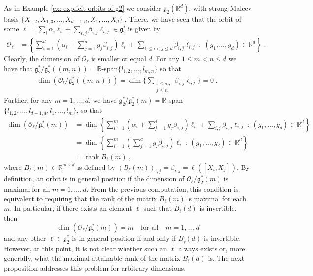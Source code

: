 \documentclass[10pt,a4paper]{amsart}
\newcommand{\R}{\mathbb{R}}
\newcommand{\fancyg}{\mathfrak{g}}
\begin{document}
	\begin{example}\label{ex: general orbits of g2 pt1}
		As in Example \ref{ex: explicit orbits of g2} we consider $\fancyg_2(\R^d)$, with strong Malcev basis $\{X_{1,2}, X_{1,3}, \ldots, X_{d-1,d},X_1, \ldots, X_d\}$ . There, we have seen that the orbit of some $\ell = \sum_i \alpha_i \ell_i + \sum_{i,j} \beta_{i,j} \ell_{i,j} \in \fancyg_2^*$ is given by
		\begin{align*}
			\mathcal{O}_\ell &= \left\{\sum_{i=1}^d(\alpha_i+\sum_{j=1}^dg_{j}\beta_{i,j})\ell_i+\sum_{1\leq i<j\leq d}\beta_{i,j}\ell_{i,j} \;:\; (g_{1}, \ldots, g_d) \in \mathbb{R}^d\right\} \;.
		\end{align*}
		Clearly, the dimension of $\mathcal{O}_\ell$ is smaller or equal $d$. For any $1 \leq m<n\leq d$ we have that $\fancyg_2^*/\fancyg_{2}^*((m, n)) = \R$-span$\{l_{1,2}, \ldots,l_{m,n}\}$ so that
		\begin{align*}
			\dim\left(\mathcal{O}_\ell/\fancyg_{2}^*((m, n))\right)= \dim\Big\{\sum_{\substack{i\leq m,\\j\leq n}}\beta_{i,j}\ell_{i,j}\Big\} = 0 \;. \;
		\end{align*}
		Further, for any $m = 1, \ldots, d$, we have $\fancyg_2^*/\fancyg_{2}^*(m) = \R$-span$\{l_{1,2}, \ldots,l_{d-1,d}, l_1, \ldots, l_m\}$, so that
		\begin{align*}
			\dim\left(\mathcal{O}_\ell/\fancyg_{2}^*(m)\right)&= \dim\left\{\sum_{i=1}^m(\alpha_i+\sum_{j=1}^dg_{j}\beta_{i,j})\ell_i+\sum_{i,j}\beta_{i,j}\ell_{i,j} \;:\; (g_{1}, \ldots, g_d) \in \mathbb{R}^d\right\}\\
			&=\dim\left\{\sum_{i=1}^m\left(\sum_{j=1}^dg_{j}\beta_{i,j}\right)\ell_i \;:\; (g_{1}, \ldots, g_d) \in \mathbb{R}^d\right\}\\
			&=\operatorname{rank} B_\ell(m) \;,
		\end{align*}
		where $B_\ell(m) \in \R^{m\times d}$ is defined by $(B_\ell(m))_{i,j} = \beta_{i,j} = \ell([X_i,X_j])$. By definition, an orbit is in general position if the dimension of $\mathcal{O}_\ell / \mathfrak{g}_2^*(m)$ is maximal for all $m = 1, \ldots, d$. From the previous computation, this condition is equivalent to requiring that the rank of the matrix $B_\ell(m)$ is maximal for each $m$. In particular, if there exists an element $\ell$ such that $B_\ell(d)$ is invertible, then
		\[\dim\left(\mathcal{O}_\ell/\fancyg_{2}^*(m)\right) = m \quad
		\text{for all} \quad m = 1, \ldots, d\]
		and any other $\tilde{\ell} \in \mathfrak{g}_2^*$ is in general position if and only if $B_{\tilde{\ell}}(d)$ is invertible. However, at this point, it is not clear whether such an $\ell$ always exists or, more generally, what the maximal attainable rank of the matrix $B_\ell(d)$ is. The next proposition addresses this problem for arbitrary dimensions.
	\end{example}
\end{document}
